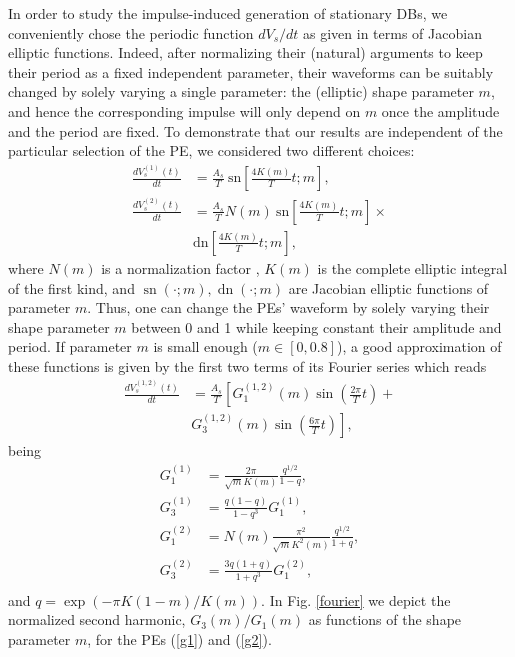 \documentclass[showpacs,preprintnumbers,10pt,onecolumn]{revtex4}%
\begin{document}
In order to study the impulse-induced
generation of stationary DBs, we conveniently chose the periodic function
$dV_s/d t$ as given in terms of Jacobian elliptic functions. Indeed, after
normalizing their (natural) arguments to keep their period as a fixed
independent parameter, their waveforms can be suitably changed by solely
varying a single parameter: the (elliptic) shape parameter $m$, and hence the
corresponding impulse will only depend on $m$ once the amplitude and the
period are fixed. To demonstrate that our results are independent of the
particular selection of the PE, we considered two different choices:
\begin{align}
\frac{dV_{s}^{(1)}(t)}{dt } &  =\frac{A_s}{T}\medspace\text{sn}\left[
\frac{4K(m)}{T}t;m\right]  ,\label{g1}\\
\frac{dV_{s}^{(2)}(t)}{d t} &  =\frac{A_s}{T}N(m)\medspace\text{sn}%
\left[  \frac{4K(m)}{T}t;m\right]  \times\nonumber\\
&  \text{dn}\left[  \frac{4K(m)}{T} t;m\right]  ,\label{g2}%
\end{align}
where $N(m)$ is a normalization factor \cite{CCP16}, $K(m)$ is the complete
elliptic integral of the first kind, and $\operatorname{sn}\left(
\cdot;m\right)  ,\operatorname*{dn}\left(  \cdot;m\right)  $ are Jacobian
elliptic functions of parameter $m$. Thus, one can change the PEs' waveform by
solely varying their shape parameter $m$ between 0 and 1 while keeping
constant their amplitude and period. If parameter $m$ is small enough ($m \in [0,0.8]$), a good approximation of these functions is given by
the first two terms of its Fourier series which reads
\begin{align}
\frac{dV_{s}^{(1,2)}(t)}{dt } &  =\frac{A_s}{T}\left[G^{(1,2)}_1(m) \sin\left(\frac{2 \pi}{T} t\right)+ \right. \nonumber \\ & \left. G^{(1,2)}_3 (m) \sin\left(\frac{6 \pi}{T} t\right)\right],\label{g1a}
\end{align}
being 
\begin{align}
G^{(1)}_1 & =\frac{2 \pi}{\sqrt{m} K(m)} \frac{q^{1/2}}{1-q}, \\
G^{(1)}_3 & =\frac{q(1-q)}{1-q^3} G^{(1)}_1, \\
G^{(2)}_1 & =N(m) \frac{\pi^2}{\sqrt{m} K^2(m)} \frac{q^{1/2}}{1+q}, \\
G^{(2)}_3 & =\frac{3q(1+q)}{1+q^3 } G^{(2)}_1, \\
\end{align}
and $q=\exp{(-\pi K(1-m)/K(m))}$.  In Fig. \ref{fourier} we depict the normalized second harmonic,
$G_{3}(m)/G_{1}(m)$ as functions of the shape parameter $m$, for the PEs (\ref{g1}) and (\ref{g2}).
\end{document}
